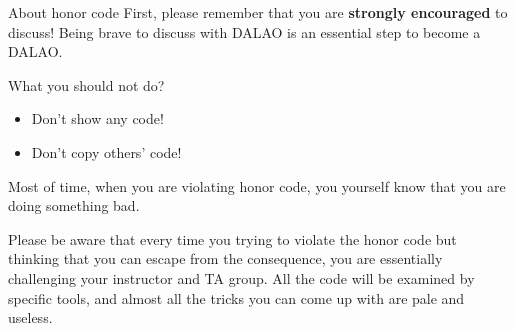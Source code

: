 \begin{frame}{About honor code}
First, please remember that you are \textbf{strongly encouraged} to discuss! Being brave to discuss with DALAO is an essential step to become a DALAO.

\begin{block}{What you should not do?}
\begin{itemize}
    \item Don't show any code! 
    \item Don't copy others' code! 
\end{itemize}
\end{block}
Most of time, when you are violating honor code, you yourself know that you are doing something bad. 

Please be aware that every time you trying to violate the honor code but thinking that you can escape from the consequence, you are essentially challenging your instructor and TA group. All the code will be examined by specific tools, and almost all the tricks you can come up with are pale and useless. 
\end{frame}